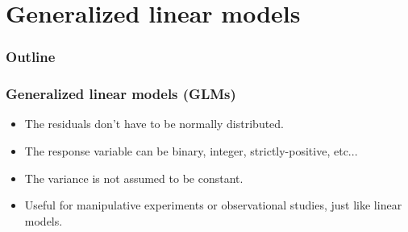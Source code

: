 \documentclass[color=usenames,dvipsnames]{beamer}\usepackage[]{graphicx}\usepackage[]{xcolor}
\begin{document}






\section{Generalized linear models}



\begin{frame}[plain]
  \frametitle{Outline}
  \Large
  \tableofcontents[currentsection]
\end{frame}




\begin{frame}
  \frametitle{Generalized linear models (GLMs)}
  \large
  \begin{itemize}%
    \item<2-> The residuals don't have to be normally distributed.
    \item<3-> The response variable can be binary, integer,
      strictly-positive, etc...
    \item<4-> The variance is not assumed to be constant.
    \item<5-> Useful for manipulative experiments or observational
      studies, just like linear models.
  \end{itemize}
  \vfill
\end{frame}
\end{document}
